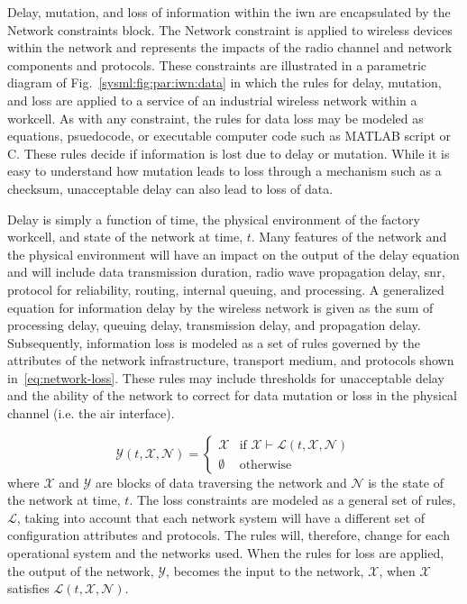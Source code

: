 Delay, mutation, and loss of information within the \gls{iwn} are encapsulated by the Network constraints block.  The Network constraint is applied to wireless devices within the network and represents the impacts of the radio channel and network components and protocols.  These constraints are illustrated in a parametric diagram of Fig.~\ref{sysml:fig:par:iwn:data} in which the rules for delay, mutation, and loss are applied to a service of an industrial wireless network within a workcell. As with any constraint, the rules for data loss may be modeled as equations, psuedocode, or executable computer code such as MATLAB script or C.  These rules decide if information is lost due to delay or mutation.  While it is easy to understand how mutation leads to loss through a mechanism such as a checksum, unacceptable delay can also lead to loss of data.  

Delay is simply a function of time, the physical environment of the factory workcell, and state of the network at time, $t$. Many features of the network and the physical environment will have an impact on the output of the delay equation and will include data transmission duration, radio wave propagation delay, \gls{snr}, protocol for reliability, routing, internal queuing, and processing. A generalized equation for information delay by the wireless network is given as the sum of processing delay, queuing delay, transmission delay, and propagation delay. Subsequently, information loss is modeled as a set of rules governed by the attributes of the network infrastructure, transport medium, and protocols shown in~\eqref{eq:network-loss}. These rules may include thresholds for unacceptable delay and the ability of the network to correct for data mutation or loss in the physical channel (i.e. the air interface).

\begin{equation}\label{eq:network-loss}
\mathcal{Y}(t,\mathcal{X},\mathcal{N}) = 
\begin{cases} 
\mathcal{X} & \text{if } \mathcal{X} \vdash \mathcal{L}(t,\mathcal{X},\mathcal{N}) \\
\emptyset   & \text{otherwise}
\end{cases}
\end{equation}
where $\mathcal{X}$ and $\mathcal{Y}$ are blocks of data traversing the network and $\mathcal{N}$ is the state of the network at time, $t$.	The loss constraints are modeled as a general set of rules, $\mathcal{L}$, taking into account that each network system will have a different set of configuration attributes and protocols.  The rules will, therefore, change for each operational system and the networks used.  When the rules for loss are applied, the output of the network, $\mathcal{Y}$, becomes the input to the network, $\mathcal{X}$, when $\mathcal{X}$ satisfies $\mathcal{L}(t,\mathcal{X},\mathcal{N})$.

